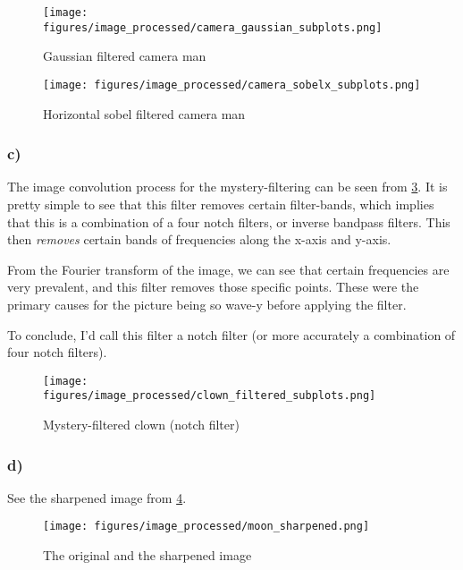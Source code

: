\begin{figure}[]
    \centering
    \texttt{[image: figures/image\_processed/camera\_gaussian\_subplots.png]}
    \caption{Gaussian filtered camera man}
    \label{fig:camera_gaussian}
\end{figure}

\begin{figure}[]
    \centering
    \texttt{[image: figures/image\_processed/camera\_sobelx\_subplots.png]}
    \caption{Horizontal sobel filtered camera man}
    \label{fig:camera_sobelx}
\end{figure}

\subsubsection*{c)}
The image convolution process for the mystery-filtering can be seen from \cref{fig:clown_filtered}. It is pretty simple to see that this filter removes certain filter-bands, which implies that this is a combination of a four notch filters, or inverse bandpass filters. This then \textit{removes} certain bands of frequencies along the x-axis and y-axis. 

From the Fourier transform of the image, we can see that certain frequencies are very prevalent, and this filter removes those specific points. These were the primary causes for the picture being so wave-y before applying the filter. 

To conclude, I'd call this filter a notch filter (or more accurately a combination of four notch filters). 

\begin{figure}[]
    \centering
    \texttt{[image: figures/image\_processed/clown\_filtered\_subplots.png]}
    \caption{Mystery-filtered clown (notch filter)}
    \label{fig:clown_filtered}
\end{figure}

\subsubsection*{d)}
See the sharpened image from \cref{fig:moon_sharpened}.

\begin{figure}[]
    \centering
    \texttt{[image: figures/image\_processed/moon\_sharpened.png]}
    \caption{The original and the sharpened image}
    \label{fig:moon_sharpened}
\end{figure}